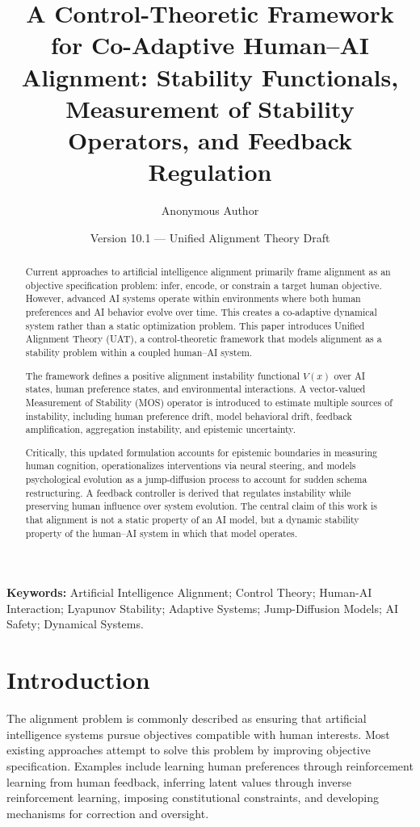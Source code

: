 \documentclass[11pt]{article}
\title{
A Control-Theoretic Framework for Co-Adaptive Human--AI Alignment:
Stability Functionals, Measurement of Stability Operators,
and Feedback Regulation
}
\author{Anonymous Author}
\date{Version 10.1 --- Unified Alignment Theory Draft}
\begin{document}
\maketitle

\begin{abstract}
Current approaches to artificial intelligence alignment primarily frame alignment as an objective specification problem: infer, encode, or constrain a target human objective. However, advanced AI systems operate within environments where both human preferences and AI behavior evolve over time. This creates a co-adaptive dynamical system rather than a static optimization problem. This paper introduces Unified Alignment Theory (UAT), a control-theoretic framework that models alignment as a stability problem within a coupled human--AI system. 

The framework defines a positive alignment instability functional $V(x)$ over AI states, human preference states, and environmental interactions. A vector-valued Measurement of Stability (MOS) operator is introduced to estimate multiple sources of instability, including human preference drift, model behavioral drift, feedback amplification, aggregation instability, and epistemic uncertainty. 

Critically, this updated formulation accounts for epistemic boundaries in measuring human cognition, operationalizes interventions via neural steering, and models psychological evolution as a jump-diffusion process to account for sudden schema restructuring. A feedback controller is derived that regulates instability while preserving human influence over system evolution. The central claim of this work is that alignment is not a static property of an AI model, but a dynamic stability property of the human--AI system in which that model operates.
\end{abstract}

\textbf{Keywords:} Artificial Intelligence Alignment; Control Theory; Human-AI Interaction; Lyapunov Stability; Adaptive Systems; Jump-Diffusion Models; AI Safety; Dynamical Systems.

\section{Introduction}
The alignment problem is commonly described as ensuring that artificial intelligence systems pursue objectives compatible with human interests. Most existing approaches attempt to solve this problem by improving objective specification. Examples include learning human preferences through reinforcement learning from human feedback, inferring latent values through inverse reinforcement learning, imposing constitutional constraints, and developing mechanisms for correction and oversight.
\end{document}
